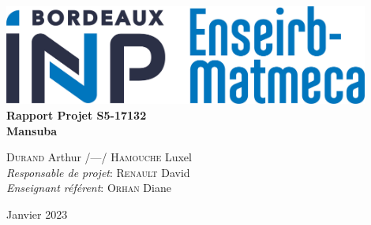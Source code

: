 \begin{titlepage}
    \begin{center}
        \vspace*{\fill}
        
        \includegraphics[width=0.9\textwidth]{logo_em.jpg}~\\[3cm]
        
        {\Huge \bfseries Rapport Projet S5-17132\\Mansuba\\[0.5cm]}
        
        \large \textsc{Durand} Arthur /---/ \textsc{Hamouche} Luxel \\[3cm]
        
        \large
        \emph{Responsable de projet}: \textsc{Renault} David \\
        \emph{Enseignant référent}: \textsc{Orhan} Diane
        
        \vspace*{\fill}
        
        \large Janvier 2023
    \end{center}
\end{titlepage}